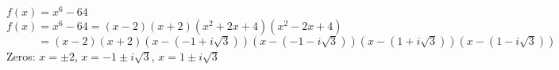 {$f(x) = x^6-64$}
{$f(x) = x^6 - 64 = (x-2)(x+2)\left(x^2+2x+4\right)\left(x^2-2x+4\right)$ \\
      $\phantom{f(x)} = (x-2)(x+2)\left( x - \left( -1+i\sqrt{3} \right) \right)\left( x - \left( -1-i\sqrt{3} \right) \right)\left( x - \left( 1+i\sqrt{3} \right) \right)\left( x - \left( 1-i\sqrt{3} \right) \right)$ \\
Zeros:  $x = \pm 2$, $x = -1 \pm i\sqrt{3}$, $x = 1 \pm i\sqrt{3}$}
